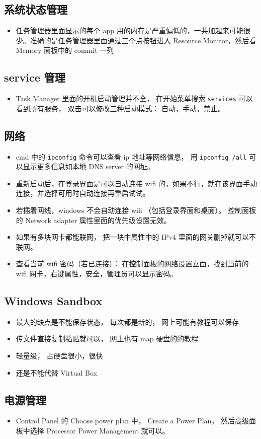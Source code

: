 \subsection{系统状态管理}
\begin{itemize}
\item 任务管理器里面显示的每个 app 用的内存是严重偏低的，一共加起来可能很少。准确的是任务管理器里面通过三个点按钮进入 Resource Monitor，然后看 Memory 面板中的 commit 一列
\end{itemize}

\subsection{service 管理}
\begin{itemize}
\item Task Manager 里面的开机启动管理并不全， 在开始菜单搜索 \verb`services` 可以看到所有服务， 双击可以修改三种启动模式： 自动，手动，禁止。
\end{itemize}

\subsection{网络}
\begin{itemize}
\item cmd 中的 \verb`ipconfig` 命令可以查看 ip 地址等网络信息， 用 \verb`ipconfig /all` 可以显示更多信息如本地 DNS server 的网址。
\item 重新启动后，在登录界面是可以自动连接 wifi 的，如果不行，就在该界面手动连接，并选择可用时自动连接再重启试试。
\item 若插着网线，windows 不会自动连接 wifi （包括登录界面和桌面）。 控制面板的 Network adapter 属性里面的优先级设置无效。
\item 如果有多块网卡都能联网， 把一块中属性中的 IPv4 里面的网关删掉就可以不联网。
\item 查看当前 wifi 密码（若已连接）： 在控制面板的网络设置立面，找到当前的 wifi 网卡，右键属性，安全，管理员可以显示密码。
\end{itemize}

\subsection{Windows Sandbox}
\begin{itemize}
\item 最大的缺点是不能保存状态， 每次都是新的， 网上可能有教程可以保存
\item 传文件直接复制粘贴就可以， 网上也有 map 硬盘的的教程
\item 轻量级， 占硬盘很小，很快
\item 还是不能代替 Virtual Box
\end{itemize}

\subsection{电源管理}
\begin{itemize}
\item Control Panel 的 Choose power plan 中， Create a Power Plan， 然后高级面板中选择 Processor Power Management 就可以。
\end{itemize}
